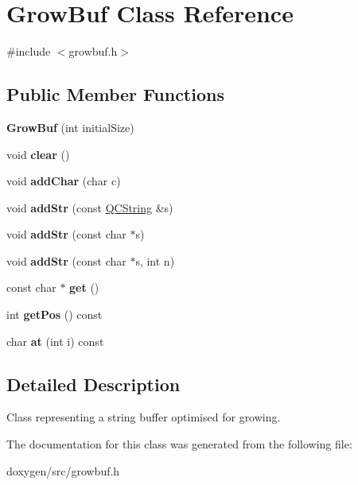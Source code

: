 \hypertarget{class_grow_buf}{}\section{Grow\+Buf Class Reference}
\label{class_grow_buf}


{\ttfamily \#include $<$growbuf.\+h$>$}

\subsection*{Public Member Functions}
\begin{DoxyCompactItemize}
\item 
\mbox{\label{class_grow_buf_a813e3f96d25b3346f4d73671d3b25c6f}} 
{\bfseries Grow\+Buf} (int initial\+Size)
\item 
\mbox{\label{class_grow_buf_a7aadcbc3d02fe6e01acf45d892cff0ba}} 
void {\bfseries clear} ()
\item 
\mbox{\label{class_grow_buf_a46b4677f555d2abc718f26e71a59efda}} 
void {\bfseries add\+Char} (char c)
\item 
\mbox{\label{class_grow_buf_a5e0ff6d9f7a7139725d77a9d669340f3}} 
void {\bfseries add\+Str} (const \mbox{\hyperlink{class_q_c_string}{Q\+C\+String}} \&s)
\item 
\mbox{\label{class_grow_buf_ac2a971c747abdd4cb7cb038a3e27197b}} 
void {\bfseries add\+Str} (const char $\ast$s)
\item 
\mbox{\label{class_grow_buf_afac18a4ba578aaa629d2139694c619ae}} 
void {\bfseries add\+Str} (const char $\ast$s, int n)
\item 
\mbox{\label{class_grow_buf_ad3c02793a6af0024c063e67f1254803c}} 
const char $\ast$ {\bfseries get} ()
\item 
\mbox{\label{class_grow_buf_a6f34b9d13425727a8bc0ed0765c1f962}} 
int {\bfseries get\+Pos} () const
\item 
\mbox{\label{class_grow_buf_a9b8b3e0258843c334c9aa9df13a1b3cc}} 
char {\bfseries at} (int i) const
\end{DoxyCompactItemize}


\subsection{Detailed Description}
Class representing a string buffer optimised for growing. 

The documentation for this class was generated from the following file\+:\begin{DoxyCompactItemize}
\item 
doxygen/src/growbuf.\+h\end{DoxyCompactItemize}
